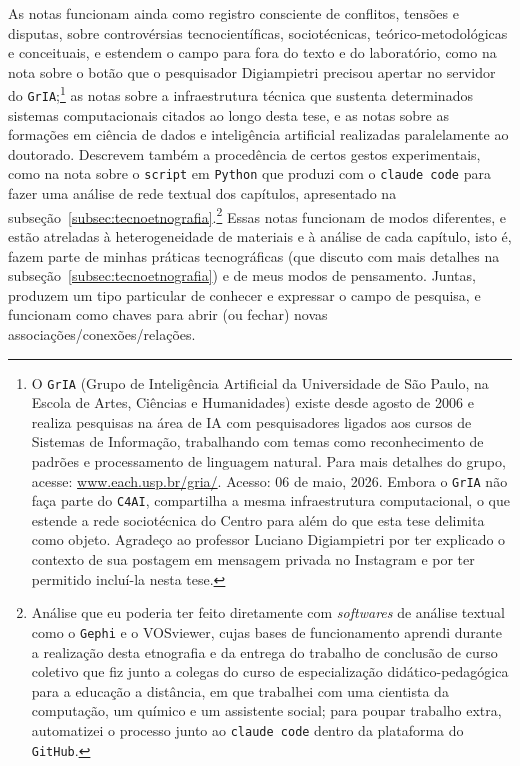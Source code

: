 As notas funcionam ainda como registro consciente de conflitos, tensões e disputas, sobre controvérsias tecnocientíficas, sociotécnicas, teórico-metodológicas e conceituais, e estendem o campo para fora do texto e do laboratório, como na nota sobre o botão que o pesquisador Digiampietri precisou apertar no servidor do \texttt{GrIA};\footnote{O \texttt{GrIA} (Grupo de Inteligência Artificial da Universidade de São Paulo, na Escola de Artes, Ciências e Humanidades) existe desde agosto de 2006 e realiza pesquisas na área de IA com pesquisadores ligados aos cursos de Sistemas de Informação, trabalhando com temas como reconhecimento de padrões e processamento de linguagem natural. Para mais detalhes do grupo, acesse: \url{www.each.usp.br/gria/}. Acesso: 06 de maio, 2026. Embora o \texttt{GrIA} não faça parte do \texttt{C4AI}, compartilha a mesma infraestrutura computacional, o que estende a rede sociotécnica do Centro para além do que esta tese delimita como objeto. Agradeço ao professor Luciano Digiampietri por ter explicado o contexto de sua postagem em mensagem privada no Instagram e por ter permitido incluí-la nesta tese.} as notas sobre a infraestrutura técnica que sustenta determinados sistemas computacionais citados ao longo desta tese, e as notas sobre as formações em ciência de dados e inteligência artificial realizadas paralelamente ao doutorado. Descrevem também a procedência de certos gestos experimentais, como na nota sobre o \texttt{script} em \texttt{Python} que produzi com o \texttt{claude code} para fazer uma análise de rede textual dos capítulos, apresentado na subseção~\ref{subsec:tecnoetnografia}.\footnote{Análise que eu poderia ter feito diretamente com \textit{softwares} de análise textual como o \texttt{Gephi} e o VOSviewer, cujas bases de funcionamento aprendi durante a realização desta etnografia e da entrega do trabalho de conclusão de curso coletivo que fiz junto a colegas do curso de especialização didático-pedagógica para a educação a distância, em que trabalhei com uma cientista da computação, um químico e um assistente social; para poupar trabalho extra, automatizei o processo junto ao \texttt{claude code} dentro da plataforma do \texttt{GitHub}.} Essas notas funcionam de modos diferentes, e estão atreladas à heterogeneidade de materiais e à análise de cada capítulo, isto é, fazem parte de minhas práticas tecnográficas (que discuto com mais detalhes na subseção~\ref{subsec:tecnoetnografia}) e de meus modos de pensamento. Juntas, produzem um tipo particular de conhecer e expressar o campo de pesquisa, e funcionam como chaves para abrir (ou fechar) novas associações/conexões/relações. 

